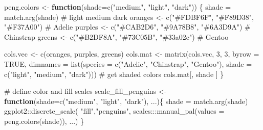 \documentclass[
  letterpaper,
  10pt,
  krantz2]{krantz}
\makeatletter
\newenvironment{Shaded}{\begin{snugshade}}{\end{snugshade}}
\newcommand{\AttributeTok}[1]{\textcolor[rgb]{0.40,0.45,0.13}{#1}}
\newcommand{\CommentTok}[1]{\textcolor[rgb]{0.37,0.37,0.37}{#1}}
\newcommand{\ConstantTok}[1]{\textcolor[rgb]{0.56,0.35,0.01}{#1}}
\newcommand{\ControlFlowTok}[1]{\textcolor[rgb]{0.00,0.23,0.31}{\textbf{#1}}}
\newcommand{\DecValTok}[1]{\textcolor[rgb]{0.68,0.00,0.00}{#1}}
\newcommand{\FunctionTok}[1]{\textcolor[rgb]{0.28,0.35,0.67}{#1}}
\newcommand{\NormalTok}[1]{\textcolor[rgb]{0.00,0.23,0.31}{#1}}
\newcommand{\OtherTok}[1]{\textcolor[rgb]{0.00,0.23,0.31}{#1}}
\newcommand{\SpecialCharTok}[1]{\textcolor[rgb]{0.37,0.37,0.37}{#1}}
\newcommand{\StringTok}[1]{\textcolor[rgb]{0.13,0.47,0.30}{#1}}
\newenvironment{kframe}{%
  \medskip{}
  \setlength{\fboxsep}{.8em}
  \def\at@end@of@kframe{}%
  \ifinner\ifhmode%
  \def\at@end@of@kframe{\end{minipage}}%
  \begin{minipage}{\columnwidth}%
  \fi\fi%
  \def\FrameCommand##1{\hskip\@totalleftmargin \hskip-\fboxsep
  \colorbox{shadecolor}{##1}\hskip-\fboxsep
      \hskip-\linewidth \hskip-\@totalleftmargin \hskip\columnwidth}%
  \MakeFramed {\advance\hsize-\width
    \@totalleftmargin\z@ \linewidth\hsize
    \@setminipage}}%
{\par\unskip\endMakeFramed%
  \at@end@of@kframe}
\renewenvironment{Shaded}{\begin{kframe}}{\end{kframe}}
\makeatother
\begin{document}
{\begin{Shaded}
\begin{Highlighting}[]
\NormalTok{peng.colors }\OtherTok{\textless{}{-}} \ControlFlowTok{function}\NormalTok{(}\AttributeTok{shade=}\FunctionTok{c}\NormalTok{(}\StringTok{"medium"}\NormalTok{, }\StringTok{"light"}\NormalTok{, }\StringTok{"dark"}\NormalTok{)) \{}
\NormalTok{  shade }\OtherTok{=} \FunctionTok{match.arg}\NormalTok{(shade)}
  \CommentTok{\#             light      medium     dark}
\NormalTok{  oranges }\OtherTok{\textless{}{-}} \FunctionTok{c}\NormalTok{(}\StringTok{"\#FDBF6F"}\NormalTok{, }\StringTok{"\#F89D38"}\NormalTok{, }\StringTok{"\#F37A00"}\NormalTok{)  }\CommentTok{\# Adelie}
\NormalTok{  purples }\OtherTok{\textless{}{-}} \FunctionTok{c}\NormalTok{(}\StringTok{"\#CAB2D6"}\NormalTok{, }\StringTok{"\#9A78B8"}\NormalTok{, }\StringTok{"\#6A3D9A"}\NormalTok{)  }\CommentTok{\# Chinstrap}
\NormalTok{  greens }\OtherTok{\textless{}{-}}  \FunctionTok{c}\NormalTok{(}\StringTok{"\#B2DF8A"}\NormalTok{, }\StringTok{"\#73C05B"}\NormalTok{, }\StringTok{"\#33a02c"}\NormalTok{)  }\CommentTok{\# Gentoo}
  
\NormalTok{  cols.vec }\OtherTok{\textless{}{-}} \FunctionTok{c}\NormalTok{(oranges, purples, greens)}
\NormalTok{  cols.mat }\OtherTok{\textless{}{-}} 
    \FunctionTok{matrix}\NormalTok{(cols.vec, }\DecValTok{3}\NormalTok{, }\DecValTok{3}\NormalTok{, }
           \AttributeTok{byrow =} \ConstantTok{TRUE}\NormalTok{,}
           \AttributeTok{dimnames =} \FunctionTok{list}\NormalTok{(}\AttributeTok{species =} \FunctionTok{c}\NormalTok{(}\StringTok{"Adelie"}\NormalTok{, }\StringTok{"Chinstrap"}\NormalTok{, }\StringTok{"Gentoo"}\NormalTok{),}
                           \AttributeTok{shade =} \FunctionTok{c}\NormalTok{(}\StringTok{"light"}\NormalTok{, }\StringTok{"medium"}\NormalTok{, }\StringTok{"dark"}\NormalTok{)))}
  \CommentTok{\# get shaded colors}
\NormalTok{  cols.mat[, shade ]}
\NormalTok{\}}

\CommentTok{\# define color and fill scales}
\NormalTok{scale\_fill\_penguins }\OtherTok{\textless{}{-}} \ControlFlowTok{function}\NormalTok{(}\AttributeTok{shade=}\FunctionTok{c}\NormalTok{(}\StringTok{"medium"}\NormalTok{, }\StringTok{"light"}\NormalTok{, }\StringTok{"dark"}\NormalTok{), ...)\{}
\NormalTok{  shade }\OtherTok{=} \FunctionTok{match.arg}\NormalTok{(shade)}
\NormalTok{  ggplot2}\SpecialCharTok{::}\FunctionTok{discrete\_scale}\NormalTok{(}
    \StringTok{"fill"}\NormalTok{,}\StringTok{"penguins"}\NormalTok{,}
\NormalTok{     scales}\SpecialCharTok{:::}\FunctionTok{manual\_pal}\NormalTok{(}\AttributeTok{values =} \FunctionTok{peng.colors}\NormalTok{(shade)), ...)}
\NormalTok{\}}


\end{Highlighting}
\end{Shaded}}
\end{document}
